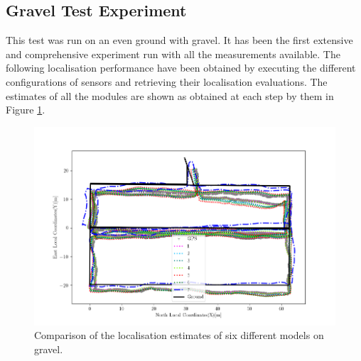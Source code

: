 \subsection{Gravel Test Experiment }
\noindent This test was run on an even ground with gravel.
It has been the first extensive and comprehensive experiment run with all the measurements available.
The following localisation performance have been obtained by executing the different configurations of sensors and retrieving their localisation evaluations.
The estimates of all the modules are shown as obtained at each step by them in Figure \ref{fig:gravel-model}.
\begin{figure}[!ht]
			\begin{center}
				\includegraphics[clip , width=1 \textwidth]{Images/5-Results/GravelLoc.png} %
			\end{center}
			\caption{Comparison of the localisation estimates of six different models on gravel.\label{fig:gravel-model}}
\end{figure}


